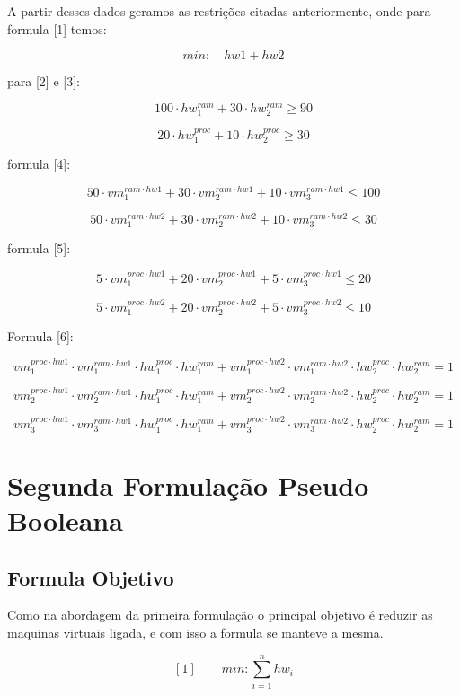 A partir desses dados geramos as restrições citadas anteriormente, onde para formula [1] temos:

    $$min: \quad hw1 + hw2 $$

para [2] e [3]:

    $$ 100 \cdot hw_1^{ram} + 30 \cdot hw_2^{ram} \geq 90$$

    $$ 20 \cdot hw_1^{proc} + 10 \cdot hw_2^{proc}  \geq 30$$
    

formula [4]:

$$ 50 \cdot vm_1^{ram \cdot hw1} + 30 \cdot vm_2^{ram \cdot hw1} + 10 \cdot vm_3^{ram \cdot hw1}\leq 100$$


$$ 50 \cdot vm_1^{ram \cdot hw2} + 30 \cdot vm_2^{ram \cdot hw2} + 10 \cdot vm_3^{ram \cdot hw2}\leq 30$$

formula [5]:

$$ 5 \cdot vm_1^{proc \cdot hw1} + 20 \cdot vm_2^{proc \cdot hw1} + 5 \cdot vm_3^{proc \cdot hw1}\leq 20$$


$$ 5 \cdot vm_1^{proc \cdot hw2} + 20 \cdot vm_2^{proc \cdot hw2} + 5 \cdot vm_3^{proc \cdot hw2}\leq 10$$

Formula [6]:


$$vm_1^{proc \cdot hw1} \cdot vm_{1}^{ram \cdot hw1} \cdot hw_{1}^{proc} \cdot hw_{1}^{ram} + vm_1^{proc \cdot hw2} \cdot vm_{1}^{ram \cdot hw2} \cdot hw_{2}^{proc} \cdot hw_{2}^{ram} = 1 $$


$$vm_2^{proc \cdot hw1} \cdot vm_{2}^{ram \cdot hw1} \cdot hw_{1}^{proc} \cdot hw_{1}^{ram} + vm_2^{proc \cdot hw2} \cdot vm_{2}^{ram \cdot hw2} \cdot hw_{2}^{proc} \cdot hw_{2}^{ram} = 1 $$


$$vm_3^{proc \cdot hw1} \cdot vm_{3}^{ram \cdot hw1} \cdot hw_{1}^{proc} \cdot hw_{1}^{ram} + vm_3^{proc \cdot hw2} \cdot vm_{3}^{ram \cdot hw2} \cdot hw_{2}^{proc} \cdot hw_{2}^{ram} = 1 $$

\section{Segunda Formulação Pseudo Booleana}

\subsection{Formula Objetivo}
 
 Como na abordagem da primeira formulação o principal objetivo é reduzir as maquinas virtuais ligada, e com isso a formula se manteve a mesma.

 $$[1] \qquad min: \sum_{i=1}^{n} hw_{i}$$	

